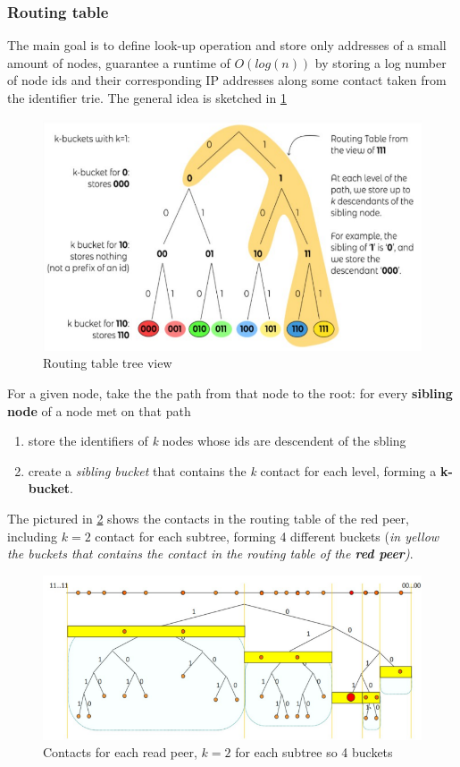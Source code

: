 \documentclass[10pt,a4paper]{report}
\begin{document}
\subsubsection{Routing table}\label{sec:routing-table}
The main goal is to define look-up operation and store only addresses of a small amount of nodes, guarantee a runtime of $O(log(n))$ by storing  a log number of node ids and their corresponding IP addresses along some contact taken from the identifier trie. The general idea is sketched in \ref{yellow-tree}
\begin{figure}[h]
	\centering
	\includegraphics[scale=0.45]{images/Pasted image 20230304105841.png}
	\caption{Routing table tree view}
	\label{yellow-tree}
\end{figure}


For a given node, take the the path from that node to the root: for every \textbf{sibling node} of a node met on that path
\begin{enumerate}
	\item 
	store the identifiers of \textit{k} nodes whose ids are descendent of the sbling
	\item 
	create a \textit{sibling bucket} that contains the \textit{k} contact for each level, forming a  \textbf{k-bucket}.
\end{enumerate}
\clearpage
The pictured in \ref{bucket-structure} shows the contacts in the routing table of the red peer, including  $k = 2$ contact for each subtree, forming 4 different buckets (\textit{in yellow the buckets that contains the contact in the routing table of the \textbf{red peer})}.
\begin{figure}
	\centering
	\includegraphics[scale=0.60]{images/Pasted image 20230303151057.png}
	\caption{Contacts for each read peer, $k=2$ for each subtree so 4 buckets}
\label{bucket-structure}
\end{figure}
\end{document}
